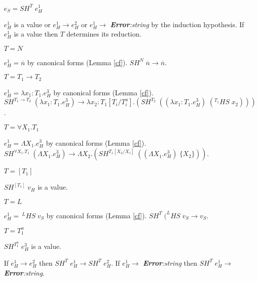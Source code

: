 \begin{case}
$e_{S}=SH^{T}\;e_{H}^{1}$

$e_{H}^{1}$ is a value or $e_{H}^{1}\rightarrow e_{H}^{2}$ or $e_{H}^{1}\rightarrow$ \emph{\textbf{Error}:\;string} by the induction hypothesis.  If $e_{H}^{1}$ is a value then $T$ determines its reduction.
\begin{subcase}
$T=N$

$e_{H}^{1}=\overline{n}$ by canonical forms (Lemma \ref{cf}).  $SH^{N}\;\overline{n}\rightarrow\overline{n}$.
\end{subcase}
\begin{subcase}
$T=T_{1}\rightarrow T_{2}$

$e_{H}^{1}=\lambda x_{1}:T_{1}.e_{H}^{3}$ by canonical forms (Lemma \ref{cf}).  $SH^{T_{1}\rightarrow T_{2}}\;(\lambda x_{1}:T_{1}.e_{H}^{3})\rightarrow\lambda x_{2}:T_{1}[T_{i}/T^{a}_{i}].(SH^{T_{2}}\;((\lambda x_{1}:T_{1}.e_{H}^{3})\;(^{T_{1}}HS\;x_{2})))$.
\end{subcase}
\begin{subcase}
$T=\forall X_{1}.T_{1}$

$e_{H}^{1}=\Lambda X_{1}.e_{H}^{3}$ by canonical forms (Lemma \ref{cf}).  $SH^{\forall X_{1}.T_{1}}\;(\Lambda X_{1}.e_{H}^{3})\rightarrow\Lambda X_{2}.(SH^{T_{1}[X_{2}/X_{1}]}\;((\Lambda X_{1}.e_{H}^{3})\;\lbrace X_{2}\rbrace))$.
\end{subcase}
\begin{subcase}
$T=[T_{1}]$

$SH^{[T_{1}]}\;v_{H}$ is a value.
\end{subcase}
\begin{subcase}
$T=L$

$e_{H}^{1}=\,^{L}HS\;v_{S}$ by canonical forms (Lemma \ref{cf}).  $SH^{T}\;(^{L}HS\;v_{S}\rightarrow v_{S}$.
\end{subcase}
\begin{subcase}
$T=T_{1}^{a}$

$SH^{T_{1}^{a}}\;e_{H}^{3}$ is a value.
\end{subcase}
If $e_{H}^{1}\rightarrow e_{H}^{2}$ then $SH^{T}\;e_{H}^{1}\rightarrow SH^{T}\;e_{H}^{2}$.  If $e_{H}^{1}\rightarrow$ \emph{\textbf{Error}:\;string} then $SH^{T}\;e_{H}^{1}\rightarrow$ \emph{\textbf{Error}:\;string}.
\end{case}